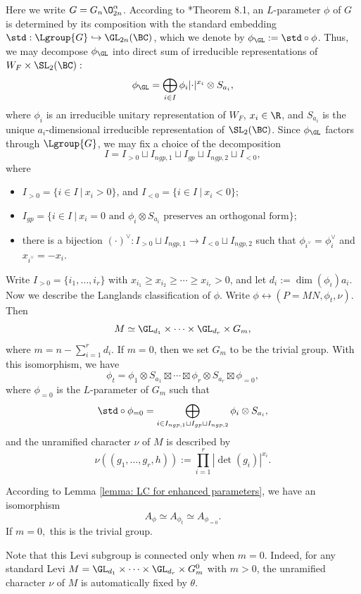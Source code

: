 \documentclass[11pt,letterpaper]{amsart}
\numberwithin{equation}{section}
\begin{document}
Here we write $G = G_n \O_{2n}^{\alpha}$.
According to \cite{GGP12}*{Theorem 8.1}, an $L$-parameter $\phi$ of $G$ is determined by its composition with the standard embedding $\std: \Lgroup{G} \hookrightarrow \GL_{2n}(\BC)$, which we denote by $\phi_{\GL}:= \std \circ \phi$. Thus, we may decompose $\phi_{\GL}$ into direct sum of irreducible representations of $W_F \times \SL_2(\BC):$
\begin{align*}
\phi_{\GL}= \bigoplus_{i \in I} \phi_{i} \lvert \cdot \rvert^{x_i} \otimes S_{a_i},
\end{align*}
where $\phi_i$ is an irreducible unitary representation of $W_F$, $x_i \in \R$, and $S_{a_i}$ is the unique $a_i$-dimensional irreducible representation of $\SL_2(\BC)$. Since $\phi_{\GL}$ factors through $\Lgroup{G}$, we may fix a choice of the decomposition 
\[ I= I_{>0} \sqcup I_{ngp,1} \sqcup I_{gp} \sqcup I_{ngp,2} \sqcup I_{<0},\]
where 
\begin{itemize}
    \item $I_{>0}= \{i \in I\ | \ x_i >0 \}$, and $I_{<0}= \{i \in I\ | \ x_i <0 \}$;
    \item $I_{gp}=\{i \in I \ | \ x_i=0 \text{ and } \phi_i \otimes S_{a_i} \text{ preserves an orthogonal form}\}$;
    \item there is a bijection $ (\cdot)^{\vee}: I_{>0} \sqcup I_{ngp,1} \to I_{<0} \sqcup I_{ngp,2}$ such that $\phi_{i^{\vee}}= \phi_{i}^{\vee}$ and $x_{i^{\vee}}= -x_i$.
\end{itemize}
Write $I_{>0}=\{i_1,\ldots, i_r\}$ with $x_{i_1}\geq x_{i_2} \geq \cdots \geq x_{i_r} >0$, and let $d_i:= \dim(\phi_i) a_i$. Now we describe the Langlands classification of $\phi$. Write $\phi \leftrightarrow (P=MN, \phi_t, \nu)$. Then
\[ M \simeq \GL_{d_1} \times \cdots \times \GL_{d_r} \times G_{m},\]
where $m= n- \sum_{i=1}^r d_i$. If $m=0$, then we set $G_m$ to be the trivial group.
With this isomorphism, we have 
\[ \phi_t= \phi_{1}\otimes S_{a_1} \boxtimes \cdots \boxtimes \phi_{r}\otimes S_{a_r} \boxtimes \phi_{=0},\]
where $\phi_{=0}$ is the $L$-parameter of $G_m$ such that
\[\std \circ \phi_{=0}= \bigoplus_{i \in I_{ngp,1} \sqcup I_{gp} \sqcup I_{ngp,2}} \phi_i \otimes S_{a_i}, \]
and the unramified character $\nu$ of $M$ is described by
\[ \nu(  (g_1,\ldots, g_r, h) ):= \prod_{i=1}^r |\det(g_i)|^{x_i}.\]

According to Lemma \ref{lemma: LC for enhanced parameters}, we have an isomorphism
\[ A_{\phi} \simeq A_{\phi_t} \simeq A_{\phi_{=0}}.\]
If $m=0,$ this is the trivial group.
\begin{remark}
    Note that this Levi subgroup is connected only when $m=0$. 
    Indeed, for any standard Levi $M=\GL_{d_1}\times\cdots\times\GL_{d_r} \times G_m^0$ with $m>0$, the unramified character $\nu$ of $M$ is automatically fixed by $\theta$.
\end{remark}
\end{document}
